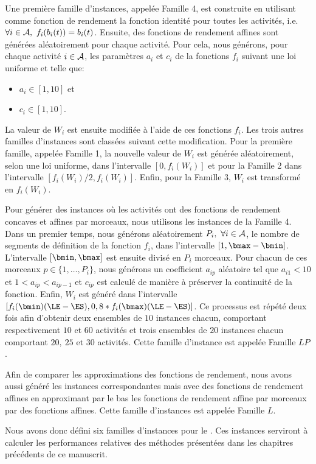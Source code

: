 Une première famille d'instances, appelée Famille 4, est construite en
utilisant comme fonction de rendement la fonction identité pour toutes
les activités, i.e. $\forall i \in \A,\ f_i(b_i(t))= b_i(t)$. Ensuite,
des fonctions de rendement affines sont générées aléatoirement pour
chaque activité. Pour cela, nous générons, pour chaque activité $i \in
{\cal A}$, les paramètres $a_i$ et $c_i$ de la fonctions $f_i$ suivant une
loi uniforme et telle que:
\begin{itemize}
\item $a_i \in [1,10]$ et
\item $c_i \in [1,10]$.
\end{itemize} 
La valeur de $W_i$ est ensuite modifiée à l'aide de ces
fonctions $f_i$. Les trois autres familles d'instances sont classées
suivant cette modification. Pour la première famille, appelée Famille
1, la nouvelle valeur de $W_i$ est générée aléatoirement, selon une
loi uniforme, dans l'intervalle $[0,f_i(W_i)]$ et pour la Famille 2
dans l'intervalle $[f_i(W_i)/2, f_i(W_i)]$. Enfin, pour la Famille 3,
$W_i$ est transformé en $f_i(W_i)$. 

Pour générer des instances où les activités ont des fonctions de
rendement concaves et affines par morceaux, nous utilisons les
instances de la Famille 4. Dans un premier temps, nous générons
aléatoirement $P_i,\ \forall i \in {\cal A}$, le nombre de segments de
définition de la fonction $f_i$, dans l'intervalle $[1 ,\bmax -
\bmin]$. L'intervalle $[\bmin,\bmax]$ est ensuite divisé en $P_i$
morceaux. Pour chacun de ces morceaux $ p \in \{1,\dots,P_i\}$, nous
générons un coefficient $a_{ip}$ aléatoire tel que $a_{i1}<10$ et $1 <
a_{ip} < a_{ip-1}$ et $c_{ip}$ est calculé de manière à préserver la
continuité de la fonction. Enfin, $W_i$ est généré dans l'intervalle
$[f_i(\bmin)(\LE-\ES), 0,8*f_i(\bmax)(\LE-\ES)]$. Ce processus est
répété deux fois afin d'obtenir deux ensembles de $10$ instances
chacun, comportant respectivement $10$ et $60$ activités et trois
ensembles de $20$ instances chacun comportant $20,\ 25$ et $30$
activités. Cette famille d'instance est appelée Famille $LP$.
 
Afin de comparer les approximations des fonctions de rendement, nous
avons aussi généré les instances correspondantes mais avec des
fonctions de rendement affines en approximant par le bas les fonctions de
rendement affine par morceaux par des fonctions affines. Cette famille
d'instances est appelée Famille $L$. 

Nous avons donc défini six familles d'instances pour le \CECSP. Ces
instances serviront à calculer les performances relatives des méthodes
présentées dans les chapitres précédents de ce manuscrit. 

